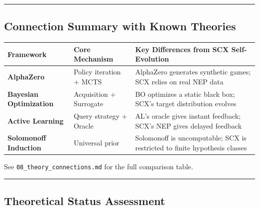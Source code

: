 \documentclass[
  12pt,
]{article}
\begin{document}
\begin{center}\rule{0.5\linewidth}{0.5pt}\end{center}

\subsection{Connection Summary with Known Theories}\label{connection-summary}

\begin{longtable}[]{@{}
  >{\raggedright\arraybackslash}p{}
  >{\raggedright\arraybackslash}p{}
  >{\raggedright\arraybackslash}p{}@{}}
\toprule\noalign{}
\begin{minipage}[b]{\linewidth}\raggedright
Framework
\end{minipage} & \begin{minipage}[b]{\linewidth}\raggedright
Core Mechanism
\end{minipage} & \begin{minipage}[b]{\linewidth}\raggedright
Key Differences from SCX Self-Evolution
\end{minipage} \\
\midrule\noalign{}
\endhead
\bottomrule\noalign{}
\endlastfoot
\textbf{AlphaZero} & Policy iteration + MCTS & AlphaZero generates synthetic games; SCX relies on real NEP data \\
\textbf{Bayesian Optimization} & Acquisition + Surrogate & BO optimizes a static black box; SCX's target distribution evolves \\
\textbf{Active Learning} & Query strategy + Oracle & AL's oracle gives instant feedback; SCX's NEP gives delayed feedback \\
\textbf{Solomonoff Induction} & Universal prior & Solomonoff is uncomputable; SCX is restricted to finite hypothesis classes \\
\end{longtable}

See \texttt{08\_theory\_connections.md} for the full comparison table.

\begin{center}\rule{0.5\linewidth}{0.5pt}\end{center}

\subsection{Theoretical Status Assessment}\label{theoretical-status}
\end{document}
